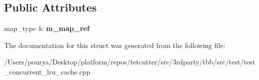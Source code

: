 \subsection*{Public Attributes}
\begin{DoxyCompactItemize}
\item 
\hypertarget{structserial__tests_1_1usability_1_1helpers_1_1map__searcher_af129b243d353e6e6e4d8a501fa77b21d}{}map\+\_\+type \& {\bfseries m\+\_\+map\+\_\+ref}\label{structserial__tests_1_1usability_1_1helpers_1_1map__searcher_af129b243d353e6e6e4d8a501fa77b21d}

\end{DoxyCompactItemize}


The documentation for this struct was generated from the following file\+:\begin{DoxyCompactItemize}
\item 
/\+Users/pourya/\+Desktop/platform/repos/tetcutter/src/3rdparty/tbb/src/test/test\+\_\+concurrent\+\_\+lru\+\_\+cache.\+cpp\end{DoxyCompactItemize}
